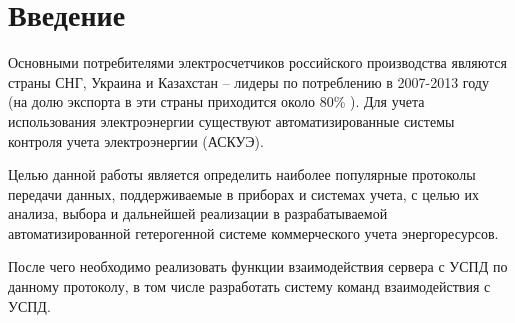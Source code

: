 \newpage

\section*{Введение}

Основными  потребителями  электросчетчиков российского производства являются страны СНГ, Украина и Казахстан – лидеры по потреблению в 2007-2013 году (на долю экспорта в эти страны приходится около  80\% \cite{rbk} ). Для учета использования электроэнергии существуют автоматизированные системы контроля учета электроэнергии (АСКУЭ).

Целью данной работы является определить наиболее популярные протоколы передачи данных, поддерживаемые в приборах и системах учета, с целью их анализа, выбора и дальнейшей реализации в разрабатываемой автоматизированной гетерогенной системе коммерческого учета энергоресурсов.

После чего необходимо реализовать функции взаимодействия сервера с УСПД по данному протоколу, в том числе разработать систему команд взаимодействия с УСПД.